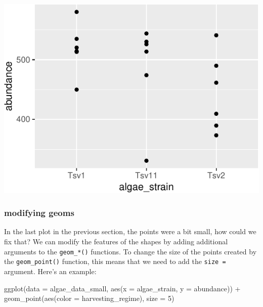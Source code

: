 \documentclass[
]{krantz}
\newenvironment{Shaded}{\begin{snugshade}}{\end{snugshade}}
\newcommand{\AttributeTok}[1]{\textcolor[rgb]{0.77,0.63,0.00}{#1}}
\newcommand{\DecValTok}[1]{\textcolor[rgb]{0.00,0.00,0.81}{#1}}
\newcommand{\FunctionTok}[1]{\textcolor[rgb]{0.00,0.00,0.00}{#1}}
\newcommand{\NormalTok}[1]{#1}
\newcommand{\SpecialCharTok}[1]{\textcolor[rgb]{0.00,0.00,0.00}{#1}}
\begin{document}
\begin{center}\includegraphics{index_files/figure-latex/unnamed-chunk-23-1} \end{center}

\hypertarget{modifying-geoms}{%
\subsubsection{modifying geoms}\label{modifying-geoms}}

In the last plot in the previous section, the points were a bit small, how could we fix that? We can modify the features of the shapes by adding additional arguments to the \texttt{geom\_*()} functions. To change the size of the points created by the \texttt{geom\_point()} function, this means that we need to add the \texttt{size\ =} argument. Here's an example:

\begin{Shaded}
\begin{Highlighting}[]
\FunctionTok{ggplot}\NormalTok{(}\AttributeTok{data =}\NormalTok{ algae\_data\_small, }\FunctionTok{aes}\NormalTok{(}\AttributeTok{x =}\NormalTok{ algae\_strain, }\AttributeTok{y =}\NormalTok{ abundance)) }\SpecialCharTok{+} 
  \FunctionTok{geom\_point}\NormalTok{(}\FunctionTok{aes}\NormalTok{(}\AttributeTok{color =}\NormalTok{ harvesting\_regime), }\AttributeTok{size =} \DecValTok{5}\NormalTok{)}
\end{Highlighting}
\end{Shaded}
\end{document}
